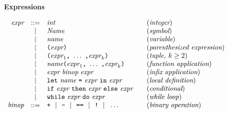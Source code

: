 \documentclass[11pt]{article}
\makeatletter
\newcommand{\prodName}[1]{&(\emph{#1})\\}
\newcommand{\nt}[1]{\textit{#1}}
\newcommand{\prog}[1]{\texttt{#1}}
\newcommand{\ORil}{\ \ |\ \ }
\newcommand{\IS}{&::=&}
\newcommand{\OR}{&|&}
\newcommand{\syntax}[2]{
  \needspace{3\baselineskip}
  \bigskip\par\noindent\textbf{#1}\par\smallskip%
  $\begin{array}{rcl@{\qquad}l}#2\end{array}$%
  \par\bigskip\noindent\ignorespaces
}
\newcommand{\lp}{\prog{(}}
\newcommand{\rp}{\prog{)}}
\newcommand{\paren}[1]{\lp#1\rp}
\makeatother
\begin{document}
\syntax{Expressions}{
\nt{expr}     \IS  \nt{int}                                 \prodName{integer}
              \OR  \nt{Name}                                 \prodName{symbol}
              \OR  \nt{name}                               \prodName{variable}
              \OR  \paren{\nt{expr}}       \prodName{parenthesized expression}
              \OR  \paren{\nt{expr}_1\prog{,}\ \ldots\ \prog{,}\nt{expr}_k}
                                                    \prodName{tuple, $k\geq 2$}
              \OR  \nt{name}\paren{\nt{expr}_1\prog{,}\ \ldots\
                                              \prog{,}\nt{expr}_k}
                                               \prodName{function application}
              \OR  \nt{expr}\ \nt{binop}\ \nt{expr}
                                                  \prodName{infix application}
             \OR  \prog{let}\ \nt{name}\ \prog{=}\ \nt{expr}\
                   \prog{in}\ \nt{expr}            \prodName{local definition}
              \OR  \prog{if}\ \nt{expr}\ \prog{then}\ \nt{expr}\
                   \prog{else}\ \nt{expr}               \prodName{conditional}
              \OR  \prog{while}\ \nt{expr}\ \prog{do}\ \nt{expr}
                                                         \prodName{while loop}
%
\nt{binop}    \IS  \prog{+} \ORil \prog{-} \ORil
                   \prog{==} \ORil \prog{!} \ORil \ldots
                                                   \prodName{binary operation}
}
%
%
%
%
%
%
%


\end{document}

